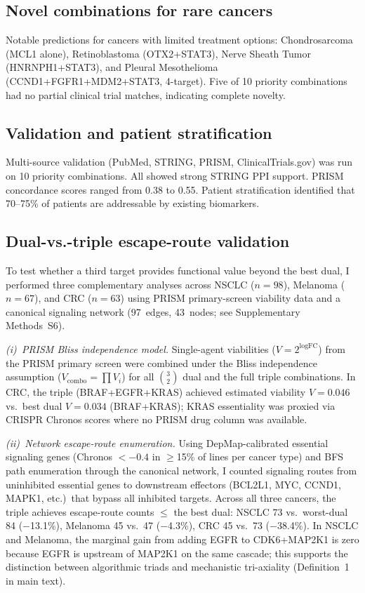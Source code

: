 \documentclass[11pt]{article}
\begin{document}
\subsection{Novel combinations for rare cancers}
Notable predictions for cancers with limited treatment options: Chondrosarcoma (MCL1 alone), Retinoblastoma (OTX2+STAT3), Nerve Sheath Tumor (HNRNPH1+STAT3), and Pleural Mesothelioma (CCND1+FGFR1+MDM2+STAT3, 4-target). Five of 10 priority combinations had no partial clinical trial matches, indicating complete novelty.

\subsection{Validation and patient stratification}
Multi-source validation (PubMed, STRING, PRISM, ClinicalTrials.gov) was run on 10 priority combinations. All showed strong STRING PPI support. PRISM concordance scores ranged from 0.38 to 0.55. Patient stratification identified that 70--75\% of patients are addressable by existing biomarkers.

\subsection{Dual-vs.-triple escape-route validation}
\label{sec:dual_triple}
To test whether a third target provides functional value beyond the best dual,
I performed three complementary analyses across NSCLC ($n=98$),
Melanoma ($n=67$), and CRC ($n=63$) using PRISM primary-screen
viability data and a canonical signaling network (97~edges, 43~nodes;
see Supplementary Methods~S6).

\emph{(i)~PRISM Bliss independence model.} Single-agent viabilities
($V = 2^{\textrm{logFC}}$) from the PRISM primary screen were combined
under the Bliss independence assumption ($V_{\mathrm{combo}} = \prod V_i$)
for all $\binom{3}{2}$ dual and the full triple combinations.
In CRC, the triple (BRAF+EGFR+KRAS) achieved estimated viability
$V=0.046$ vs.\ best dual $V=0.034$ (BRAF+KRAS); KRAS
essentiality was proxied via CRISPR Chronos scores where no PRISM
drug column was available.

\emph{(ii)~Network escape-route enumeration.} Using DepMap-calibrated
essential signaling genes (Chronos $< -0.4$ in $\geq$15\% of lines per
cancer type) and BFS path enumeration through the canonical network,
I counted signaling routes from uninhibited essential genes to
downstream effectors (BCL2L1, MYC, CCND1, MAPK1, etc.)\ that bypass
all inhibited targets. Across all three cancers, the triple achieves
escape-route counts $\leq$ the best dual: NSCLC 73 vs.\ worst-dual 84
($-$13.1\%), Melanoma 45 vs.\ 47 ($-$4.3\%), CRC 45 vs.\ 73
($-$38.4\%). In NSCLC and Melanoma, the marginal gain from adding
EGFR to CDK6+MAP2K1 is zero because EGFR is upstream of MAP2K1 on the
same cascade; this supports the distinction between algorithmic triads
and mechanistic tri-axiality (Definition~1 in main text).
\end{document}
